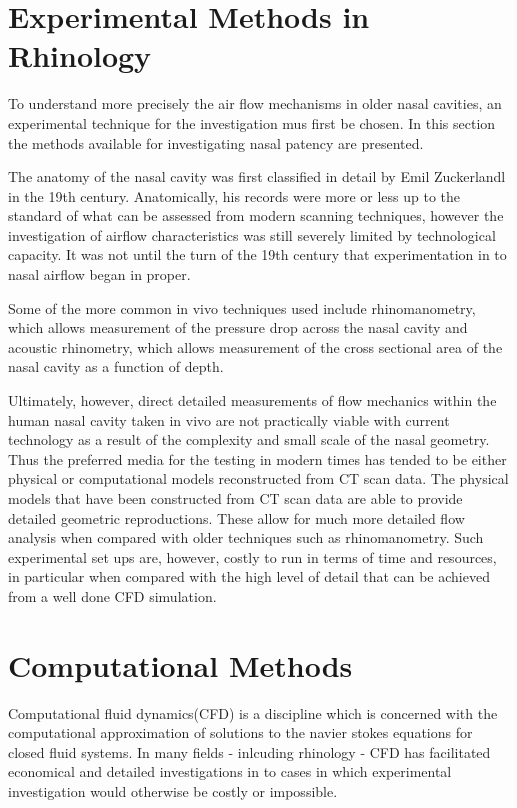  \section{Experimental Methods in Rhinology}
 
To understand more precisely the air flow mechanisms in older nasal cavities, an experimental technique for the investigation mus first be chosen. In this section the methods available for investigating nasal patency are presented.

The anatomy of the nasal cavity was first classified in detail by Emil Zuckerlandl in the 19th century\cite{Stammberger1989}. Anatomically, his records were more or less up to the standard of what can be assessed from modern scanning techniques\cite{Stammberger1989}, however the investigation of airflow characteristics was still severely limited by technological capacity\cite{Eccles2000}. It was not until the turn of the 19th century that experimentation in to nasal airflow began in proper\cite{Eccles2000}. 

Some of the more common in vivo techniques used include rhinomanometry, which allows measurement of the pressure drop across the nasal cavity\cite{Hilberg1989} and acoustic rhinometry, which allows measurement of the cross sectional area of the nasal cavity as a function of depth\cite{Hilberg1989}. 

Ultimately, however, direct detailed measurements of flow mechanics within the human nasal cavity taken in vivo are not practically viable with current technology as a result of the complexity and small scale of the nasal geometry\cite{Doorly2008c}. Thus the preferred media for the testing in modern times has tended to be either physical or computational models reconstructed from CT scan data\cite{Doorly2008c}. The physical models that have been constructed from CT scan data are able to provide detailed geometric reproductions. These allow for much more detailed flow analysis when compared with older techniques such as rhinomanometry\cite{Ma2009}. Such experimental set ups are, however, costly to run in terms of time and resources, in particular when compared with the high level of detail that can be achieved from a well done CFD simulation\cite{Ma2009}.

\section{Computational Methods} 
Computational fluid dynamics(CFD) is a discipline which is concerned with the computational approximation of solutions to the navier stokes equations for closed fluid systems\cite{Tu2008}. In many fields - inlcuding rhinology - CFD has facilitated economical and detailed investigations in to cases in which experimental investigation would otherwise be costly or impossible\cite{Keyhani1995}.

